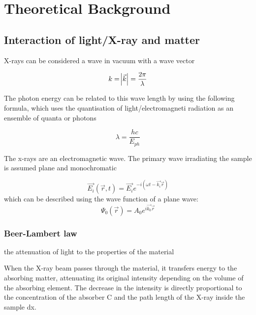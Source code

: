 \chapter{Theoretical Background}
\label{chap:theory_SAXS}

\section{Interaction of light/X-ray and matter}

X-rays can be considered a wave in vacuum with a wave vector 

\begin{equation}
        k=\abs{\vec{k}} = \frac{2\pi}{\lambda}
\end{equation}

The photon energy can be related to this wave length by using the following formula, which uses the quantisation of light/electromagneti radiation as an ensemble of quanta or photons

\begin{equation}
        \lambda = \frac{h c}{E_{ph}}
\end{equation}

The x-rays are an electromagnetic wave. The primary wave irradiating the sample is assumed plane and monochromatic

\begin{equation}
        \vec{E_i}\left( \vec{r},t \right)=\vec{E_i}e^{-i\left( \omega t - \vec{k_i}\vec{r} \right)}
\end{equation}
which can be described using the wave function of a plane wave:
\begin{equation}
        \Psi_0\left( \vec{r} \right)=A_0 e^{i \vec{k_0}\vec{r} }
\end{equation}

\subsection{Beer-Lambert law}
\label{sec:BeerLambert}

the attenuation of light to the properties of the material 

When the X-ray beam passes through the material, it transfers energy to the absorbing matter, attenuating its original intensity depending on the volume of the absorbing element. The decrease in the intensity is directly proportional to the concentration of the absorber C and the path length of the X-ray inside the sample dx.

